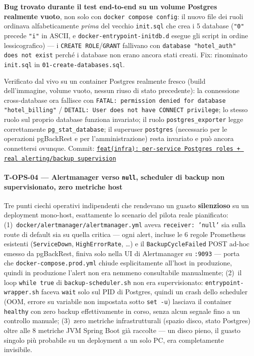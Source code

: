 ﻿\documentclass[a4paper,12pt]{report}
\newcommand{\commitref}[2]{\texttt{\small \href{https://github.com/diegoandruccioli/hotel-pms/commit/#1}{#2}}}
\begin{document}
\textbf{Bug trovato durante il test end-to-end su un volume Postgres
realmente vuoto}, non solo con \texttt{docker compose config}: il nuovo
file dei ruoli ordinava alfabeticamente \emph{prima} del vecchio
\texttt{init.sql} che crea i 5 database (\texttt{"0"} precede
\texttt{"i"} in ASCII, e \texttt{docker-entrypoint-initdb.d} esegue gli
script in ordine lessicografico) --- i \texttt{CREATE ROLE}/\texttt{GRANT}
fallivano con \texttt{database "hotel\_auth" does not exist} perché i
database non erano ancora stati creati. Fix: rinominato \texttt{init.sql}
in \texttt{01-create-databases.sql}.

Verificato dal vivo su un container Postgres realmente fresco (build
dell'immagine, volume vuoto, nessun riuso di stato precedente): la
connessione cross-database ora fallisce con
\texttt{FATAL: permission denied for database "hotel\_billing"} /
\texttt{DETAIL: User does not have CONNECT privilege}; lo stesso ruolo
sul proprio database funziona invariato; il ruolo \texttt{postgres\_exporter}
legge correttamente \texttt{pg\_stat\_database}; il superuser
\texttt{postgres} (necessario per le operazioni pgBackRest e per
l'amministrazione) resta invariato e può ancora connettersi ovunque.
Commit: \commitref{5195fd0}{feat(infra): per-service Postgres roles + real alerting/backup supervision}

\paragraph{T-OPS-04 --- Alertmanager verso \texttt{null}, scheduler di backup non supervisionato, zero metriche host}
Tre punti ciechi operativi indipendenti che rendevano un guasto
\textbf{silenzioso} su un deployment mono-host, esattamente lo scenario
del pilota reale pianificato: (1)~\texttt{docker/alertmanager/alertmanager.yml}
aveva \texttt{receiver: 'null'} sia sulla route di default sia su quella
critica --- ogni alert, incluse le 6 regole Prometheus esistenti
(\texttt{ServiceDown}, \texttt{HighErrorRate}, \dots) e il
\texttt{BackupCycleFailed} POST ad-hoc emesso da pgBackRest, finiva solo
nella UI di Alertmanager su \texttt{:9093} --- porta che
\texttt{docker-compose.prod.yml} chiude esplicitamente all'host in
produzione, quindi in produzione l'alert non era nemmeno consultabile
manualmente; (2)~il loop \texttt{while true} di \texttt{backup-scheduler.sh}
non era supervisionato: \texttt{entrypoint-wrapper.sh} faceva
\texttt{wait} solo sul PID di Postgres, quindi un crash dello scheduler
(OOM, errore su variabile non impostata sotto \texttt{set -u}) lasciava
il container \texttt{healthy} con zero backup effettivamente in corso,
senza alcun segnale fino a un controllo manuale; (3)~zero metriche
infrastrutturali (spazio disco, stato Postgres) oltre alle 8 metriche JVM
Spring Boot già raccolte --- un disco pieno, il guasto singolo più
probabile su un deployment a un solo PC, era completamente invisibile.
\end{document}
